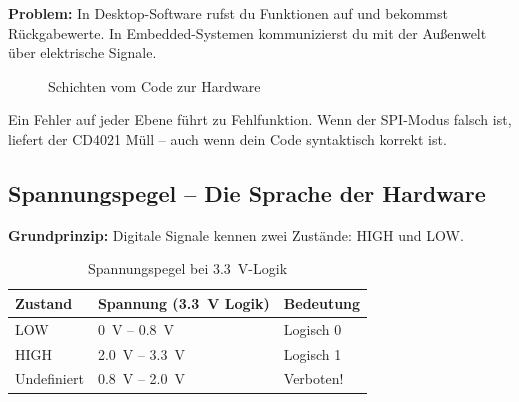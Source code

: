 \textbf{Problem:} In Desktop-Software rufst du Funktionen auf und bekommst Rückgabewerte. In Embedded-Systemen kommunizierst du mit der Außenwelt über elektrische Signale.

\begin{figure}[htbp]
\centering
{}
\caption{Schichten vom Code zur Hardware}
\label{fig:hardware-schichten}
\end{figure}

\begin{warnbox}[Konsequenz]
Ein Fehler auf jeder Ebene führt zu Fehlfunktion. Wenn der SPI-Modus falsch ist, liefert der CD4021 Müll – auch wenn dein Code syntaktisch korrekt ist.
\end{warnbox}

\subsection{Spannungspegel – Die Sprache der Hardware}

\textbf{Grundprinzip:} Digitale Signale kennen zwei Zustände: HIGH und LOW.

\begin{table}[htbp]
\centering
\begin{tabular}{@{}lll@{}}
\toprule
\textbf{Zustand} & \textbf{Spannung (\SI{3,3}{\volt} Logik)} & \textbf{Bedeutung} \\
\midrule
LOW         & \SI{0}{\volt} – \SI{0,8}{\volt}   & Logisch 0 \\
HIGH        & \SI{2,0}{\volt} – \SI{3,3}{\volt} & Logisch 1 \\
Undefiniert & \SI{0,8}{\volt} – \SI{2,0}{\volt} & Verboten! \\
\bottomrule
\end{tabular}
\caption{Spannungspegel bei \SI{3,3}{\volt}-Logik}
\label{tab:spannungspegel}
\end{table}

